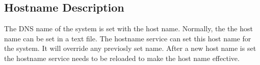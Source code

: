 \subsection{Hostname Description}

The DNS name of the system is set with the host name. Normally,
the the host name can be set in a text file. The hostname service
can set this host name for the system. It will override any previosly set
name. After a new host name is set the hostname service needs to be reloaded
to make the host name effective.
